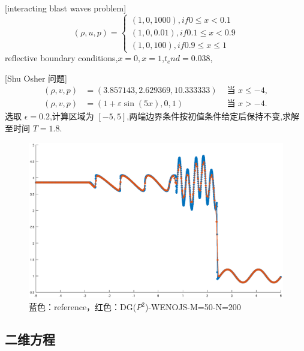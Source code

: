 \documentclass{book}
\begin{document}
\begin{example}{}{}

    [interacting blast waves problem\cite{RN204}]
    \begin{equation}
        (\rho,u,p)=
        \begin{cases}
            (1,0,1000), if 0\leqslant x<0.1      \\
            (1,0,0.01), if 0.1 \leqslant x < 0.9 \\
            (1,0,100),if 0.9\leqslant x \leqslant 1
        \end{cases}
    \end{equation}
    reflective boundary conditions,$x=0,x=1$,$t_end=0.038$,
\end{example}
\begin{example}{}{}

    [Shu Osher 问题\cite{RN109}]
    \begin{equation}
        \begin{aligned}
            (\rho, v, p) & =(3.857143,2.629369,10.333333)   & \text { 当 } x \leq-4, \\
            (\rho, v, p) & =(1+\varepsilon \sin (5 x), 0,1) & \text { 当 } x>-4 .
        \end{aligned}
    \end{equation}
    选取 $\epsilon = 0.2$,计算区域为 $[-5,5]$,两端边界条件按初值条件给定后保持不变,求解至时间 $T=1.8$.
    \begin{figure}[H]
        \centering
        \label{fig:}
        \includegraphics[width=0.7\linewidth]{fig/shu_osher.eps}
        \caption{蓝色：reference，红色：DG($P^2$)-WENOJS-M=50-N=200}
    \end{figure}

\end{example}

\subsection{二维方程}
\end{document}
